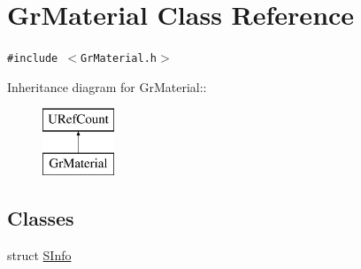 \hypertarget{class_gr_material}{
\section{GrMaterial Class Reference}
\label{class_gr_material}
}
{\tt \#include $<$GrMaterial.h$>$}

Inheritance diagram for GrMaterial::\begin{figure}[H]
\begin{center}
\leavevmode
\includegraphics[height=2cm]{class_gr_material}
\end{center}
\end{figure}
\subsection*{Classes}
\begin{CompactItemize}
\item 
struct \hyperlink{struct_gr_material_1_1_s_info}{SInfo}
\end{CompactItemize}
